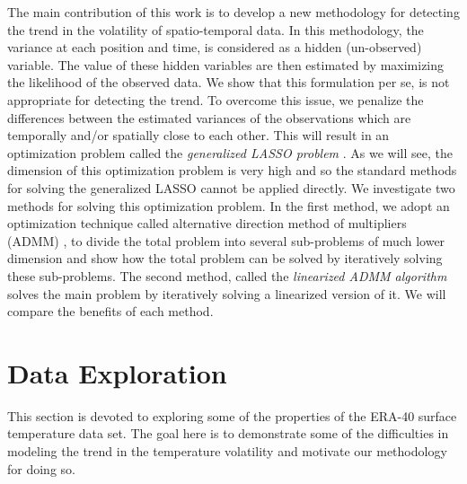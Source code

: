 \documentclass[review]{elsarticle}
\begin{document}
The main contribution of this work is to develop a new methodology for detecting the trend in the volatility of spatio-temporal data. In this methodology, the variance at each position and time, is considered as a hidden (un-observed) variable. The value of these hidden variables are then estimated by maximizing the likelihood of the observed data. We show that this formulation per se, is not appropriate for detecting the trend. To overcome this issue, we penalize the differences between the estimated variances of the observations which are temporally and/or spatially close to each other. This will result in an optimization problem called the \textit{generalized LASSO problem} \cite{tibshirani_solution_2011}. As we will see, the dimension of this optimization problem is very high and so the standard methods for solving the generalized LASSO cannot be applied directly. We investigate two methods for solving this optimization problem. In the first method, we adopt an optimization technique called alternative direction method of multipliers (ADMM) \cite{boyd_distributed_2011}, to divide the total problem into several sub-problems of much lower dimension and show how the total problem can be solved by iteratively solving these sub-problems. The second method, called the \textit{linearized ADMM algorithm} \cite{parikh_proximal_2014} solves the main problem by iteratively solving a linearized version of it. We will compare the benefits of each method.


\section{Data Exploration}
This section is devoted to exploring some of the properties of the ERA-40 surface temperature data set. The goal here is to demonstrate some of the difficulties in modeling the trend in the temperature volatility and motivate our methodology for doing so.
\end{document}
